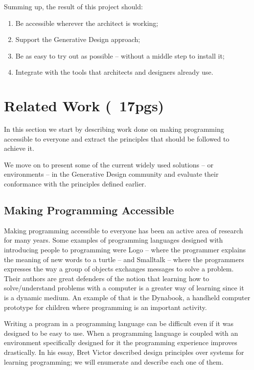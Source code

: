 \documentclass{./llncs2e/llncs}
\begin{document}
Summing up, the result of this project should:
\begin{enumerate}
	\item Be accessible wherever the architect is working; \label{obj:access}
	\item Support the Generative Design approach; \label{obj:gen-design}
	\item Be as easy to try out as possible -- without a middle step to install it; \label{obj:no-install}
	\item Integrate with the tools that architects and designers already use.\label{obj:inter-op}
\end{enumerate}


\section{Related Work (~17pgs)}
In this section we start by describing work done on making programming accessible to everyone and extract the principles that should be followed to achieve it.

We move on to present some of the current widely used solutions -- or environments -- in the Generative Design community and evaluate their conformance with the principles defined earlier.

\subsection{Making Programming Accessible}
Making programming accessible to everyone has been an active area of research for many years. Some examples of programming languages designed with introducing people to programming were Logo\cite{papert1999logo} -- where the programmer explains the meaning of new words to a turtle -- and Smalltalk\cite{goldberg1983smalltalk} -- where the programmers expresses the way a group of objects exchanges messages to solve a problem. Their authors are great defenders of the notion that learning how to solve/understand problems with a computer is a greater way of learning since it is a dynamic medium. An example of that is the Dynabook\cite{Kay:2011:PCC:800193.1971922}, a handheld computer prototype for children where programming is an important activity.

Writing a program in a programming language can be difficult even if it was designed to be easy to use. When a programming language is coupled with an environment specifically designed for it the programming experience improves drastically. In his essay\cite{victor2012learnable}, Bret Victor described design principles over systems for learning programming; we will enumerate and describe each one of them.
\end{document}
